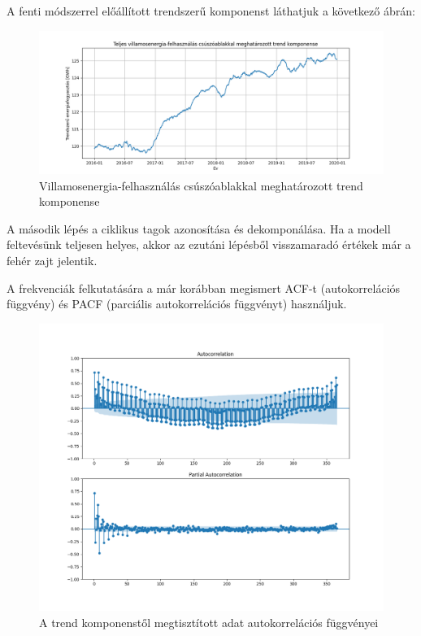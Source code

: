 A fenti módszerrel előállított trendszerű komponenst láthatjuk a következő ábrán:

\begin{figure}[htbp]
    \centering
    \includegraphics[width=1\textwidth, height=0.8\textheight, keepaspectratio]{../figures/mavir_trend_by_hand.png}
    \caption{Villamosenergia-felhasználás csúszóablakkal meghatározott trend komponense}\label{fig:mavir_trend_by_hand}
\end{figure}

A második lépés a ciklikus tagok azonosítása és dekomponálása. Ha a modell feltevésünk teljesen
helyes, akkor az ezutáni lépésből visszamaradó értékek már a fehér zajt jelentik.

A frekvenciák felkutatására a már korábban megismert ACF-t (autokorrelációs függvény) és PACF
(parciális autokorrelációs függvényt) használjuk.

\begin{figure}[htbp]
    \centering
    \includegraphics[width=1\textwidth, height=0.8\textheight, keepaspectratio]{../figures/mavir_residual_acf_by_hand.png}
    \caption{A trend komponenstől megtisztított adat autokorrelációs függvényei}\label{fig:mavir_residual_acf_by_hand}
\end{figure}

